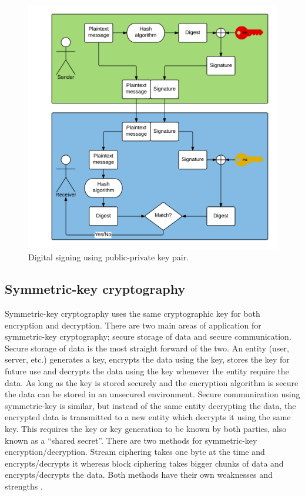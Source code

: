 \begin{figure}[h!]
  \captionsetup{justification=centering,margin=1.5cm}
  \caption{Digital signing using public-private key pair.}
  \label{fig:signing_basic}
  \centering
    \includegraphics[width=1\textwidth]{images/signing_basic.png}
\end{figure}

\subsection{Symmetric-key cryptography}
\label{sec:symmetricCrypto}
Symmetric-key cryptography uses the same cryptographic key for both encryption and decryption. There are two main areas of application for symmetric-key cryptography; secure storage of data and secure communication. Secure storage of data is the most straight forward of the two. An entity (user, server, etc.) generates a key, encrypts the data using the key, stores the key for future use and decrypts the data using the key whenever the entity require the data. As long as the key is stored securely and the encryption algorithm is secure the data can be stored in an unsecured environment. Secure communication using symmetric-key is similar, but instead of the same entity decrypting the data, the encrypted data is transmitted to a new entity which decrypts it using the same key. This requires the key or key generation to be known by both parties, also known as a ``shared secret''. There are two methods for symmetric-key encryption/decryption. Stream ciphering takes one byte at the time and encrypts/decrypts it whereas block ciphering takes bigger chunks of data and encrypts/decrypts the data. Both methods have their own weaknesses and strengths \cite[~Ch. 2.1.1]{cryptoMath}.

